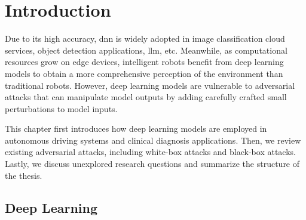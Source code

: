 \chapter{Introduction}
\label{chpt:intro}

Due to its high accuracy, \acrfull{dnn} is widely adopted in image classification cloud services, object detection applications, \acrfull{llm}, etc. Meanwhile, as computational resources grow on edge devices, intelligent robots benefit from deep learning models to obtain a more comprehensive perception of the environment than traditional robots. However, deep learning models are vulnerable to adversarial attacks that can manipulate model outputs by adding carefully crafted small perturbations to model inputs.

This chapter first introduces how deep learning models are employed in autonomous driving systems and clinical diagnosis applications. Then, we review existing adversarial attacks, including white-box attacks and black-box attacks. Lastly, we discuss unexplored research questions and summarize the structure of the thesis.


\section{Deep Learning}
\label{sec:deep_learning}


